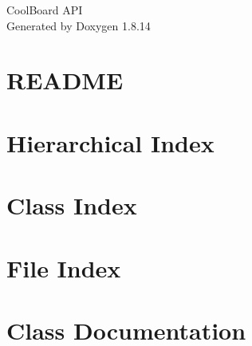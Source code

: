 \documentclass[twoside]{book}
\newcommand{\+}{\discretionary{\mbox{\scriptsize$\hookleftarrow$}}{}{}}
\newcommand{\clearemptydoublepage}{%
  \newpage{\pagestyle{empty}\cleardoublepage}%
}
\begin{document}
\hypersetup{pageanchor=false,
             bookmarksnumbered=true,
             pdfencoding=unicode
            }
\begin{titlepage}
\vspace*{7cm}
\begin{center}%
{\Large Cool\+Board A\+PI }\\
\vspace*{1cm}
{\large Generated by Doxygen 1.8.14}\\
\end{center}
\end{titlepage}
\clearemptydoublepage
{}
\tableofcontents
\clearemptydoublepage
{}
\hypersetup{pageanchor=true}

\chapter{R\+E\+A\+D\+ME}
\label{md__home_ashiroji__arduino_libraries__cool_board__r_e_a_d_m_e}

\chapter{Hierarchical Index}

\chapter{Class Index}

\chapter{File Index}

\chapter{Class Documentation}

























\end{document}
